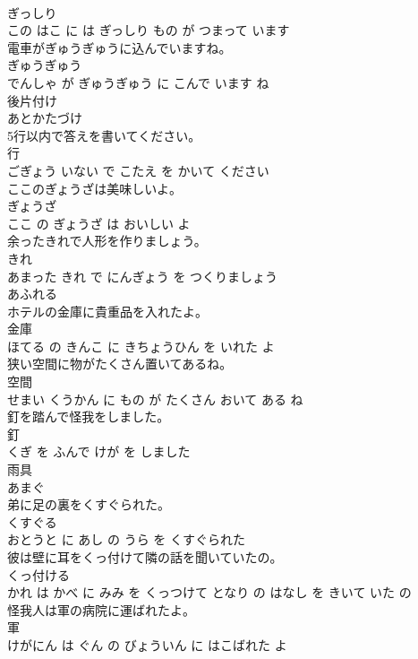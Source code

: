\documentclass[8pt]{extreport}
\begin{document}
\begin{CJK}{UTF8}{min}
\\	ぎっしり 
\\	この はこ に は ぎっしり もの が つまって います			
\\	電車がぎゅうぎゅうに込んでいますね。	
\\	ぎゅうぎゅう 
\\	でんしゃ が ぎゅうぎゅう に こんで います ね			
\\	後片付け	
\\	あとかたづけ		
\\	5行以内で答えを書いてください。	
\\	行 
\\	ごぎょう いない で こたえ を かいて ください			
\\	ここのぎょうざは美味しいよ。	
\\	ぎょうざ 
\\	ここ の ぎょうざ は おいしい よ			
\\	余ったきれで人形を作りましょう。	
\\	きれ 
\\	あまった きれ で にんぎょう を つくりましょう			
\\	あふれる	
\\	ホテルの金庫に貴重品を入れたよ。	
\\	金庫 
\\	ほてる の きんこ に きちょうひん を いれた よ			
\\	狭い空間に物がたくさん置いてあるね。	
\\	空間 
\\	せまい くうかん に もの が たくさん おいて ある ね			
\\	釘を踏んで怪我をしました。	
\\	釘 
\\	くぎ を ふんで けが を しました			
\\	雨具	
\\	あまぐ		
\\	弟に足の裏をくすぐられた。	
\\	くすぐる 
\\	おとうと に あし の うら を くすぐられた			
\\	彼は壁に耳をくっ付けて隣の話を聞いていたの。	
\\	くっ付ける 
\\	かれ は かべ に みみ を くっつけて となり の はなし を きいて いた の			
\\	怪我人は軍の病院に運ばれたよ。	
\\	軍 
\\	けがにん は ぐん の びょういん に はこばれた よ			

\end{CJK}
\end{document}

